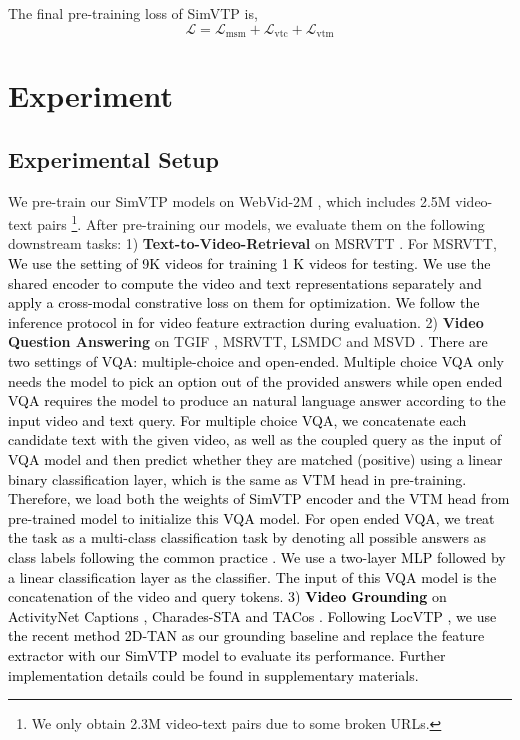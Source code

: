 \documentclass[10pt,twocolumn,letterpaper]{article}
\newcommand{\yty}[1]{\textcolor{black}{#1}}
\begin{document}
The final pre-training loss of SimVTP is,
\begin{equation}
\mathcal{L}=\mathcal{L}_{\mathrm{msm}}+\mathcal{L}_{\mathrm{vtc}}+\mathcal{L}_{\mathrm{vtm}}
\label{eq:final_loss}
\end{equation}





\section{Experiment}
\label{sec:Exp}
\subsection{Experimental Setup}
We pre-train our SimVTP models on WebVid-2M \cite{bain2021frozen}, 
which includes 2.5M video-text pairs \footnote{We only obtain 2.3M video-text pairs due to some broken URLs.}.  
After pre-training our models, we evaluate them on the following downstream tasks:
1) \textbf{Text-to-Video-Retrieval} on MSRVTT \cite{xu2016msr}. 
For MSRVTT, 
\yty{We use the setting of 9K videos for training 1 K videos for testing.}
\yty{We use the shared encoder to compute the video and text representations separately and apply a cross-modal constrative loss on them for optimization. We follow the inference protocol in \cite{tong2022videomae} for video feature extraction during evaluation.}
2) \textbf{Video Question Answering} on TGIF \cite{li2016tgif}, MSRVTT\cite{xu2016msr}, LSMDC \cite{rohrbach2015dataset} and MSVD \cite{chen2011collecting}. \yty{There are two settings of VQA:  multiple-choice and open-ended. Multiple choice VQA only needs the model to pick an option out of the provided answers while open ended VQA requires the model to produce an natural language answer according to the input video and text query. 
For multiple choice VQA, we concatenate each candidate text with the given video, as well as the coupled query as the input of VQA model and then predict whether they are matched (positive) using a linear binary classification layer, which is the same as VTM head in pre-training.  Therefore, we load both the weights of SimVTP encoder and the VTM head from pre-trained model to initialize this VQA model.
For open ended VQA, we treat the task as a multi-class classification task by denoting all possible answers as class labels following the common practice \cite{lei2021less}. We use a two-layer MLP followed by a linear classification layer as the classifier. The input of this VQA model is the concatenation of the video and query tokens. 3) \textbf{Video Grounding} on ActivityNet Captions \cite{krishna2017dense}, Charades-STA \cite{gao2017tall} and TACos \cite{regneri2013grounding}. Following LocVTP \cite{cao2022locvtp}, we use the recent method 2D-TAN \cite{zhang2020learning} as our grounding baseline and replace the feature extractor with our SimVTP model to evaluate its performance. Further implementation details could be found in supplementary materials.}
\end{document}
